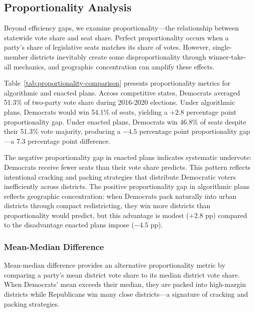 \subsection{Proportionality Analysis}
\label{sec:proportionality-analysis}

Beyond efficiency gaps, we examine proportionality---the relationship between statewide vote share and seat share. Perfect proportionality occurs when a party's share of legislative seats matches its share of votes. However, single-member districts inevitably create some disproportionality through winner-take-all mechanics, and geographic concentration can amplify these effects.

Table~\ref{tab:proportionality-comparison} presents proportionality metrics for algorithmic and enacted plans. Across competitive states, Democrats averaged 51.3\% of two-party vote share during 2016-2020 elections. Under algorithmic plans, Democrats would win 54.1\% of seats, yielding a $+2.8$ percentage point proportionality gap. Under enacted plans, Democrats win 46.8\% of seats despite their 51.3\% vote majority, producing a $-4.5$ percentage point proportionality gap---a 7.3 percentage point difference.



The negative proportionality gap in enacted plans indicates systematic undervote: Democrats receive fewer seats than their vote share predicts. This pattern reflects intentional cracking and packing strategies that distribute Democratic voters inefficiently across districts. The positive proportionality gap in algorithmic plans reflects geographic concentration: when Democrats pack naturally into urban districts through compact redistricting, they win more districts than proportionality would predict, but this advantage is modest ($+2.8$ pp) compared to the disadvantage enacted plans impose ($-4.5$ pp).

\subsubsection{Mean-Median Difference}

Mean-median difference provides an alternative proportionality metric by comparing a party's mean district vote share to its median district vote share. When Democrats' mean exceeds their median, they are packed into high-margin districts while Republicans win many close districts---a signature of cracking and packing strategies.

